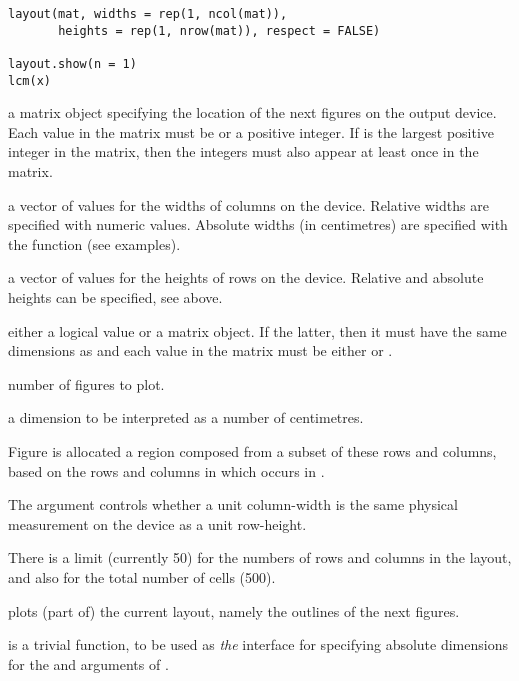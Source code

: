 %
\begin{Usage}
\begin{verbatim}
layout(mat, widths = rep(1, ncol(mat)),
       heights = rep(1, nrow(mat)), respect = FALSE)

layout.show(n = 1)
lcm(x)
\end{verbatim}
\end{Usage}
%
\begin{Arguments}
\begin{ldescription}
\item[\code{mat}] a matrix object specifying the location of the next
 figures on the output device.  Each value in the matrix must
be  or a positive integer.  If  is the largest
positive integer in the matrix, then the integers
 must also appear at least once in the matrix.
\item[\code{widths}] a vector of values for the widths of columns on the
device.  Relative widths are specified with numeric values.    Absolute
widths (in centimetres) are specified with the  function (see
examples).
\item[\code{heights}] a vector of values for the heights of rows on the device.
Relative and absolute heights can be specified, see  above.
\item[\code{respect}] either a logical value or a matrix object.  If the
latter, then it must have the same dimensions as  and
each value in the matrix must be either  or .
\item[\code{n}] number of figures to plot.
\item[\code{x}] a dimension to be interpreted as a number of centimetres.
\end{ldescription}
\end{Arguments}
%
\begin{Details}\relax
Figure  is allocated a region composed from a subset
of these rows and columns, based on the rows and columns
in which  occurs in .

The  argument controls whether a unit column-width is
the same physical measurement on the device as a unit row-height.

There is a limit (currently 50) for the numbers of rows and columns
in the layout, and also for the total number of cells (500).

 plots (part of) the current layout, namely the
outlines of the next  figures.

 is a trivial function, to be used as \emph{the} interface
for specifying absolute dimensions for the  and
 arguments of .
\end{Details}
